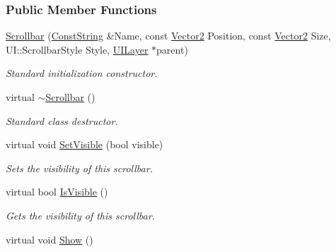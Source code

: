 \subsubsection*{Public Member Functions}
\begin{DoxyCompactItemize}
\item 
\hyperlink{classphys_1_1UI_1_1Scrollbar_a25d95bba23d00bd2e377258068e4a0bb}{Scrollbar} (\hyperlink{namespacephys_a5ce5049f8b4bf88d6413c47b504ebb31}{ConstString} \&Name, const \hyperlink{classphys_1_1Vector2}{Vector2} Position, const \hyperlink{classphys_1_1Vector2}{Vector2} Size, UI::ScrollbarStyle Style, \hyperlink{classphys_1_1UILayer}{UILayer} $\ast$parent)
\begin{DoxyCompactList}\small\item\em Standard initialization constructor. \item\end{DoxyCompactList}\item 
\hypertarget{classphys_1_1UI_1_1Scrollbar_af9fb189c7856353a930c0a228fc0cf42}{
virtual \hyperlink{classphys_1_1UI_1_1Scrollbar_af9fb189c7856353a930c0a228fc0cf42}{$\sim$Scrollbar} ()}
\label{d0/d3e/classphys_1_1UI_1_1Scrollbar_af9fb189c7856353a930c0a228fc0cf42}

\begin{DoxyCompactList}\small\item\em Standard class destructor. \item\end{DoxyCompactList}\item 
virtual void \hyperlink{classphys_1_1UI_1_1Scrollbar_a2d8997e0bbbb1c17af5128fea98fb1e4}{SetVisible} (bool visible)
\begin{DoxyCompactList}\small\item\em Sets the visibility of this scrollbar. \item\end{DoxyCompactList}\item 
virtual bool \hyperlink{classphys_1_1UI_1_1Scrollbar_a213c946ccadd3b689f59e2761a1d1848}{IsVisible} ()
\begin{DoxyCompactList}\small\item\em Gets the visibility of this scrollbar. \item\end{DoxyCompactList}\item 
\hypertarget{classphys_1_1UI_1_1Scrollbar_a42955ae0e2b273ca9ea392a8dbc62604}{
virtual void \hyperlink{classphys_1_1UI_1_1Scrollbar_a42955ae0e2b273ca9ea392a8dbc62604}{Show} ()}
\label{d0/d3e/classphys_1_1UI_1_1Scrollbar_a42955ae0e2b273ca9ea392a8dbc62604}


\end{DoxyCompactItemize}
